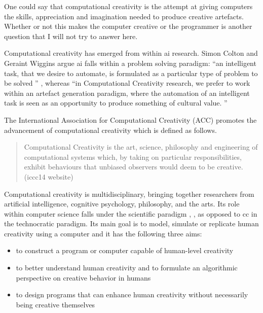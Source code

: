 \begin{draft}
  One could say that computational creativity is the attempt at giving computers the skills, appreciation and imagination needed to produce creative artefacts. Whether or not this makes the computer creative or the programmer is another question that I will not try to answer here.
\end{draft}

Computational creativity has emerged from within \gls{ai} research. Simon Colton and Geraint Wiggins argue \gls{ai} falls within a problem solving paradigm: ``an intelligent task, that we desire to automate, is formulated as a particular type of problem to be solved '' \citep[p.2]{Colton2012}, whereas ``in Computational Creativity research, we prefer to work within an artefact generation paradigm, where the automation of an intelligent task is seen as an opportunity to produce something of cultural value. '' \citep[p.2, my emphasis]{Colton2012}

The International Association for Computational Creativity (ACC)  promotes the advancement of computational creativity which is defined as follows.

\begin{quote}
  Computational Creativity is the art, science, philosophy and engineering of computational systems which, by taking on particular responsibilities, exhibit behaviours that unbiased observers would deem to be creative. (\gls{iccc}14 website)
\end{quote}

Computational creativity is multidisciplinary, bringing together researchers from artificial intelligence, cognitive psychology, philosophy, and the arts. Its role within computer science falls under the scientific paradigm \citep[p.8]{Hugill2013}, \citep[see also][]{Eden2007}, as opposed to \gls{cc} in the technocratic paradigm. Its main goal is to model, simulate or replicate human creativity using a computer and it has the following three aims:

\begin{itemize}
  \item to construct a program or computer capable of human-level creativity
  \item to better understand human creativity and to formulate an algorithmic perspective on creative behavior in humans
  \item to design programs that can enhance human creativity without necessarily being creative themselves
\end{itemize}


